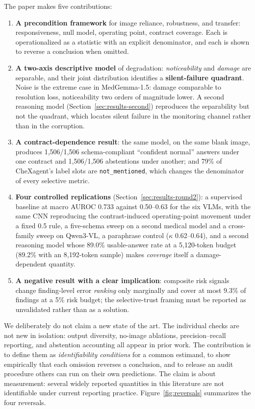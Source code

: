 The paper makes five contributions:
\begin{enumerate}[leftmargin=1.2em,itemsep=2pt,topsep=2pt]
\item \textbf{A precondition framework} for image reliance, robustness, and transfer: responsiveness, null model, operating point, contract coverage. Each is operationalized as a statistic with an explicit denominator, and each is shown to reverse a conclusion when omitted.
\item \textbf{A two-axis descriptive model} of degradation: \emph{noticeability} and \emph{damage} are separable, and their joint distribution identifies a \textbf{silent-failure quadrant}. Noise is the extreme case in MedGemma-1.5: damage comparable to resolution loss, noticeability two orders of magnitude lower. A second reasoning model (Section~\ref{sec:results-second}) reproduces the separability but not the quadrant, which locates silent failure in the monitoring channel rather than in the corruption.
\item \textbf{A contract-dependence result}: the same model, on the same blank image, produces 1,506/1,506 schema-compliant ``confident normal'' answers under one contract and 1,506/1,506 abstentions under another; and 79\% of CheXagent's label slots are \texttt{not\_mentioned}, which changes the denominator of every selective metric.
\item \textbf{Four controlled replications} (Section~\ref{sec:results-round2}): a supervised baseline at macro AUROC 0.733 against 0.50--0.63 for the six VLMs, with the same CNN reproducing the contrast-induced operating-point movement under a fixed 0.5 rule, a five-schema sweep on a second medical model and a cross-family sweep on Qwen3-VL, a paraphrase control ($\kappa$ 0.62--0.64), and a second reasoning model whose 89.0\% usable-answer rate at a 5,120-token budget (89.2\% with an 8,192-token sample) makes \emph{coverage} itself a damage-dependent quantity.
\item \textbf{A negative result with a clear implication}: composite risk signals change finding-level error \emph{ranking} only marginally and cover at most 9.3\% of findings at a 5\% risk budget; the selective-trust framing must be reported as unvalidated rather than as a solution.
\end{enumerate}

We deliberately do not claim a new state of the art. The individual checks are not new in isolation: output diversity, no-image ablations, precision--recall reporting, and abstention accounting all appear in prior work. The contribution is to define them as \emph{identifiability conditions} for a common estimand, to show empirically that each omission reverses a conclusion, and to release an audit procedure others can run on their own predictions. The claim is about measurement: several widely reported quantities in this literature are not identifiable under current reporting practice. Figure~\ref{fig:reversals} summarizes the four reversals.

